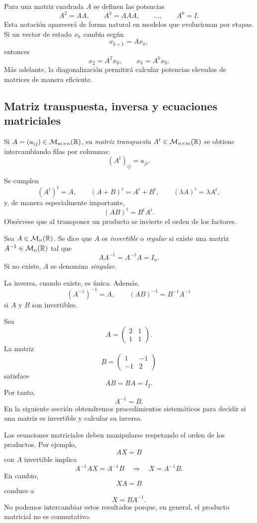 Para una matriz cuadrada $A$ se definen las potencias
\[
A^2=AA,
\qquad
A^3=AAA,
\qquad\ldots,
\qquad
A^0=I.
\]
Esta notación aparecerá de forma natural en modelos que evolucionan por etapas. Si un vector de estado $x_k$ cambia según
\[
x_{k+1}=Ax_k,
\]
entonces
\[
x_2=A^2x_0,
\qquad
x_k=A^kx_0.
\]
Más adelante, la diagonalización permitirá calcular potencias elevadas de matrices de manera eficiente.

\subsection{Matriz transpuesta, inversa y ecuaciones matriciales}

\begin{definition}
Si $A=(a_{ij})\in\mathcal M_{m\times n}(\mathbb{R})$, su \emph{matriz transpuesta} $A^t\in\mathcal M_{n\times m}(\mathbb{R})$ se obtiene intercambiando filas por columnas:
\[
(A^t)_{ij}=a_{ji}.
\]
\end{definition}

Se cumplen
\[
(A^t)^t=A,
\qquad
(A+B)^t=A^t+B^t,
\qquad
(\lambda A)^t=\lambda A^t,
\]
y, de manera especialmente importante,
\[
(AB)^t=B^tA^t.
\]
Obsérvese que al transponer un producto se invierte el orden de los factores.

\begin{definition}
Sea $A\in\mathcal M_n(\mathbb{R})$. Se dice que $A$ es \emph{invertible} o \emph{regular} si existe una matriz $A^{-1}\in\mathcal M_n(\mathbb{R})$ tal que
\[
AA^{-1}=A^{-1}A=I_n.
\]
Si no existe, $A$ se denomina \emph{singular}.
\end{definition}

La inversa, cuando existe, es única. Además,
\[
(A^{-1})^{-1}=A,
\qquad
(AB)^{-1}=B^{-1}A^{-1}
\]
si $A$ y $B$ son invertibles.

\begin{example}
Sea
\[
A=\begin{pmatrix}2&1\\1&1\end{pmatrix}.
\]
La matriz
\[
B=\begin{pmatrix}1&-1\\-1&2\end{pmatrix}
\]
satisface
\[
AB=BA=I_2.
\]
Por tanto,
\[
A^{-1}=B.
\]
En la siguiente sección obtendremos procedimientos sistemáticos para decidir si una matriz es invertible y calcular su inversa.
\end{example}

Las ecuaciones matriciales deben manipularse respetando el orden de los productos. Por ejemplo,
\[
AX=B
\]
con $A$ invertible implica
\[
A^{-1}AX=A^{-1}B
\quad\Longrightarrow\quad
X=A^{-1}B.
\]
En cambio,
\[
XA=B
\]
conduce a
\[
X=BA^{-1}.
\]
No podemos intercambiar estos resultados porque, en general, el producto matricial no es conmutativo.

